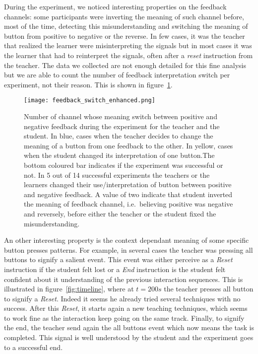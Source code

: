 During the experiment, we noticed interesting properties on the feedback channels: some participants were inverting the meaning of such channel before, most of the time, detecting this misunderstanding and switching the meaning of button from positive to negative or the reverse. In few cases, it was the teacher that realized the learner were misinterpreting the signals but in most cases it was the learner that had to reinterpret the signals, often after a \emph{reset} instruction from the teacher. The data we collected are not enough detailed for this fine analysis but we are able to count the number of feedback interpretation switch per experiment, not their reason. This is shown in figure~\ref{fig:feedback_switch_enhanced}.

\begin{figure}[H]
	\begin{center}
   		\texttt{[image: feedback\_switch\_enhanced.png]}
   		\caption{Number of channel whose meaning switch between positive and negative feedback during the experiment for the teacher and the student. In blue, cases when the teacher decides to change the meaning of a button from one feedback to the other. In yellow, cases when the student changed its interpretation of one button.The bottom coloured bar indicates if the experiment was successful or not. In 5 out of 14 successful experiments the teachers or the learners changed their use/interpretation of button between positive and negative feedback. A value of two indicate that student inverted the meaning of feedback channel, i.e.\ believing positive was negative and reversely, before either the teacher or the student fixed the misunderstanding.}
    \label{fig:feedback_switch_enhanced}
   	\end{center}
\end{figure}

An other interesting property is the context dependant meaning of some specific button presses patterns. For example, in several cases the teacher was pressing all buttons to signify a salient event. This event was either perceive as a \emph{Reset} instruction if the student felt lost or a \emph{End} instruction is the student felt confident about it understanding of the previous interaction sequences. This is illustrated in figure~\ref{fig:timeline}, where at $t=200 s$ the teacher presses all button to signify a \emph{Reset}. Indeed it seems he already tried several techniques with no success. After this \emph{Reset}, it starts again a new teaching techniques, which seems to work fine as the interaction keep going on the same track. Finally, to signify the end, the teacher send again the all buttons event which now means the task is completed. This signal is well understood by the student and the experiment goes to a successful end.

